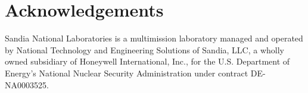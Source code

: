 \documentclass[aps,nofootinbib,pra,notitlepage,twocolumn]{revtex4-1}
\begin{document}
\section{Acknowledgements}
\label{sec:acknowledgements}
Sandia National Laboratories is a multimission laboratory managed and operated by National Technology and Engineering Solutions of Sandia, LLC, a wholly owned subsidiary of Honeywell International, Inc., for the U.S. Department of Energy's National Nuclear Security Administration under contract DE-NA0003525.

\end{document}

